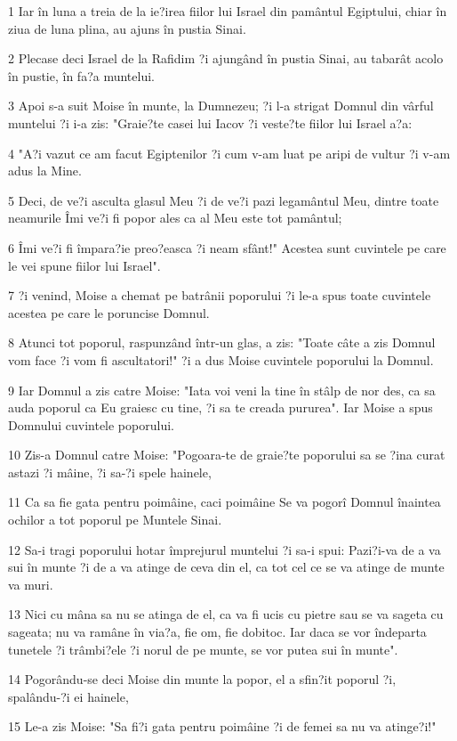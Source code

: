 \par 1 Iar în luna a treia de la ie?irea fiilor lui Israel din pamântul Egiptului, chiar în ziua de luna plina, au ajuns în pustia Sinai.
\par 2 Plecase deci Israel de la Rafidim ?i ajungând în pustia Sinai, au tabarât acolo în pustie, în fa?a muntelui.
\par 3 Apoi s-a suit Moise în munte, la Dumnezeu; ?i l-a strigat Domnul din vârful muntelui ?i i-a zis: "Graie?te casei lui Iacov ?i veste?te fiilor lui Israel a?a:
\par 4 "A?i vazut ce am facut Egiptenilor ?i cum v-am luat pe aripi de vultur ?i v-am adus la Mine.
\par 5 Deci, de ve?i asculta glasul Meu ?i de ve?i pazi legamântul Meu, dintre toate neamurile Îmi ve?i fi popor ales ca al Meu este tot pamântul;
\par 6 Îmi ve?i fi împara?ie preo?easca ?i neam sfânt!" Acestea sunt cuvintele pe care le vei spune fiilor lui Israel".
\par 7 ?i venind, Moise a chemat pe batrânii poporului ?i le-a spus toate cuvintele acestea pe care le poruncise Domnul.
\par 8 Atunci tot poporul, raspunzând într-un glas, a zis: "Toate câte a zis Domnul vom face ?i vom fi ascultatori!" ?i a dus Moise cuvintele poporului la Domnul.
\par 9 Iar Domnul a zis catre Moise: "Iata voi veni la tine în stâlp de nor des, ca sa auda poporul ca Eu graiesc cu tine, ?i sa te creada pururea". Iar Moise a spus Domnului cuvintele poporului.
\par 10 Zis-a Domnul catre Moise: "Pogoara-te de graie?te poporului sa se ?ina curat astazi ?i mâine, ?i sa-?i spele hainele,
\par 11 Ca sa fie gata pentru poimâine, caci poimâine Se va pogorî Domnul înaintea ochilor a tot poporul pe Muntele Sinai.
\par 12 Sa-i tragi poporului hotar împrejurul muntelui ?i sa-i spui: Pazi?i-va de a va sui în munte ?i de a va atinge de ceva din el, ca tot cel ce se va atinge de munte va muri.
\par 13 Nici cu mâna sa nu se atinga de el, ca va fi ucis cu pietre sau se va sageta cu sageata; nu va ramâne în via?a, fie om, fie dobitoc. Iar daca se vor îndeparta tunetele ?i trâmbi?ele ?i norul de pe munte, se vor putea sui în munte".
\par 14 Pogorându-se deci Moise din munte la popor, el a sfin?it poporul ?i, spalându-?i ei hainele,
\par 15 Le-a zis Moise: "Sa fi?i gata pentru poimâine ?i de femei sa nu va atinge?i!"
